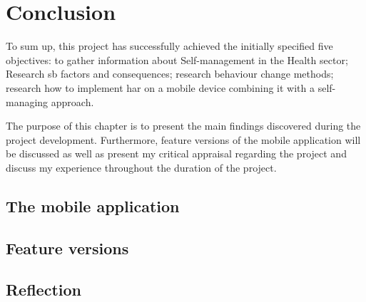\chapter{Conclusion}
To sum up, this project has successfully achieved the initially specified five objectives: to gather information about Self-management in the Health sector; Research \gls{sb} factors and consequences; research behaviour change methods; research how to implement \gls{har} on a mobile device combining it with a self-managing approach.

The purpose of this chapter is to present the main findings discovered during the project development. Furthermore, feature versions of the mobile application will be discussed as well as present my critical appraisal regarding the project and discuss my experience throughout the duration of the project. 

\section{The mobile application}

\section{Feature versions}

\section{Reflection}
